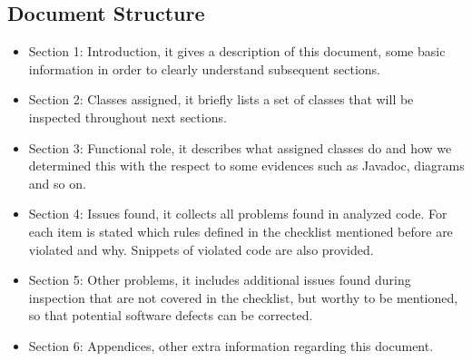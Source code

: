 \subsection{Document Structure}
\begin{itemize}
	\item Section 1: Introduction, it gives a description of this document, some basic information in order to clearly understand subsequent sections.
	\item Section 2: Classes assigned, it briefly lists a set of classes that will be inspected throughout next sections.
	\item Section 3: Functional role, it describes what assigned classes do and how we determined this with the respect to some evidences such as Javadoc, diagrams and so on.
	\item Section 4: Issues found, it collects all problems found in analyzed code. For each item is stated which rules defined in the checklist mentioned before are violated and why. Snippets of violated code are also provided.
	\item Section 5: Other problems, it includes additional issues found during inspection that are not covered in the checklist, but worthy to be mentioned, so that potential software defects can be corrected.
	\item Section 6: Appendices, other extra information regarding this document. 
\end{itemize}

